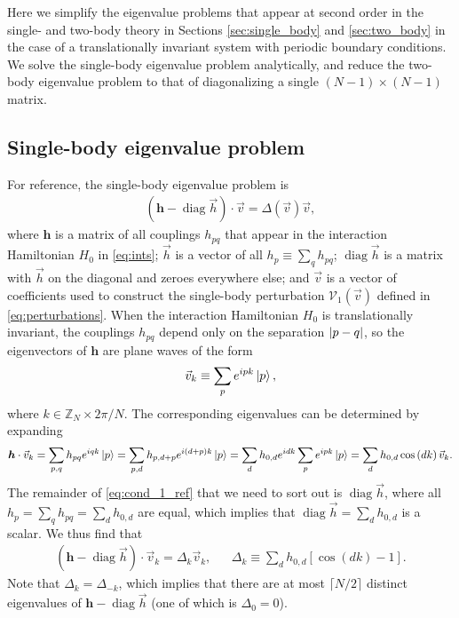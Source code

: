 \documentclass[nofootinbib,notitlepage,11pt]{revtex4-2}
\newcommand{\p}[1]{\left(#1\right)} %
\renewcommand{\sp}[1]{\left[#1\right]} %
\renewcommand{\c}{\cdot} %
\newcommand{\m}{\bm} %
\renewcommand{\v}{\vec} %
\newcommand{\1}{\mathds{1}}
\newcommand{\V}{\mathcal{V}}
\newcommand{\ZZ}{\mathbb{Z}}
\DeclareMathOperator{\diag}{diag}
\begin{document}
Here we simplify the eigenvalue problems that appear at second order
in the single- and two-body theory in Sections \ref{sec:single_body}
and \ref{sec:two_body} in the case of a translationally invariant
system with periodic boundary conditions.  We solve the single-body
eigenvalue problem analytically, and reduce the two-body eigenvalue
problem to that of diagonalizing a single $\p{N-1}\times\p{N-1}$
matrix.

\subsection{Single-body eigenvalue problem}
\label{sec:trans_inv_single}

For reference, the single-body eigenvalue problem is
\begin{align}
  \p{\m h - \diag\v h}\c\v v = \Delta\p{\v v} \v v,
  \label{eq:cond_1_ref}
\end{align}
where $\m h$ is a matrix of all couplings $h_{pq}$ that appear in the
interaction Hamiltonian $H_0$ in \eqref{eq:ints}; $\v h$ is a vector
of all $h_p\equiv\sum_q h_{pq}$; $\diag\v h$ is a matrix with $\v h$
on the diagonal and zeroes everywhere else; and $\v v$ is a vector of
coefficients used to construct the single-body perturbation
$\V_1\p{\v v}$ defined in \eqref{eq:perturbations}.  When the
interaction Hamiltonian $H_0$ is translationally invariant, the
couplings $h_{pq}$ depend only on the separation $\abs{p-q}$, so the
eigenvectors of $\m h$ are plane waves of the form
\begin{align}
  \v v_k \equiv \sum_p e^{ipk} \ket{p},
\end{align}
where $k\in\ZZ_N\times2\pi/N$.  The corresponding eigenvalues can be
determined by expanding
\begin{align}
  \m h\c\v v_k = \sum_{p,q} h_{pq} e^{iqk} \ket{p}
  = \sum_{p,d} h_{p,d+p} e^{i\p{d+p}k} \ket{p}
  = \sum_d h_{0,d} e^{idk} \sum_p e^{ipk}\ket{p}
  = \sum_d h_{0,d} \cos\p{dk} \v v_k.
\end{align}
The remainder of \eqref{eq:cond_1_ref} that we need to sort out is
$\diag\v h$, where all $h_p=\sum_qh_{pq}=\sum_dh_{0,d}$ are equal,
which implies that $\diag\v h=\sum_dh_{0,d}$ is a scalar.  We thus
find that
\begin{align}
  \p{\m h - \diag\v h}\c\v v_k = \Delta_k \v v_k,
  &&
  \Delta_k \equiv \sum_d h_{0,d} \sp{\cos\p{dk}-1}.
\end{align}
Note that $\Delta_k=\Delta_{-k}$, which implies that there are at most
$\lceil N/2\rceil$ distinct eigenvalues of $\m h - \diag\v h$ (one of
which is $\Delta_0=0$).
\end{document}
